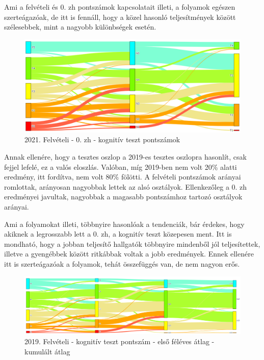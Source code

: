 \documentclass[12pt]{article}
\begin{document}
Ami a felvételi és 0. zh pontszámok kapcsolatait illeti, a folyamok egészen szerteágazóak, de itt is fennáll, hogy a közel hasonló teljesítmények között szélesebbek, mint a nagyobb különbségek esetén.

\begin{figure}[H]
\centering
\includegraphics[scale=0.573]{kepek/2021_old_felvi_0zh_teszt.png}
\caption{2021. Felvételi - 0. zh - kognitív teszt pontszámok}
\label{fig:2021_old_felvi_0zh_teszt}
\end{figure}

Annak ellenére, hogy a tesztes oszlop a 2019-es tesztes oszlopra hasonlít, csak fejjel lefelé, ez a valós eloszlás. Valóban, míg 2019-ben nem volt 20\% alatti eredmény, itt fordítva, nem volt 80\% fölötti. A felvételi pontszámok arányai romlottak, arányosan nagyobbak lettek az alsó osztályok. Ellenkezőleg a 0. zh eredményei javultak, nagyobbak a magasabb pontszámhoz tartozó osztályok arányai. 

Ami a folyamokat illeti, többnyire hasonlóak a tendenciák, bár érdekes, hogy akiknek a legrosszabb lett a 0. zh, a kognitív teszt közepesen ment. Itt is mondható, hogy a jobban teljesítő hallgatók többnyire mindenből jól teljesítettek, illetve a gyengébbek között ritkábbak voltak a jobb eredmények. Ennek ellenére itt is szerteágazóak a folyamok, tehát összefüggés van, de nem nagyon erős.


\begin{figure}[H]
\centering
\includegraphics[scale=0.6]{kepek/2019_felvi_teszt_atlag_kumatlag.png}
\caption{2019. Felvételi - kognitív teszt pontszám - első féléves átlag - kumulált átlag}
\label{fig:2019_felvi_teszt_atlag_kumatlag}
\end{figure}
\end{document}
